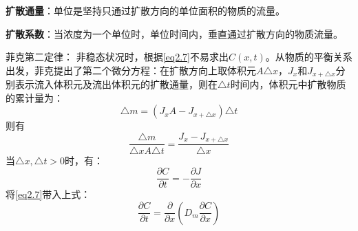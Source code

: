 \documentclass[UTF8]{ctexart}
\theoremstyle{plain}
\begin{document}
\textbf{\textcolor[rgb]{1,0,0}{扩散通量}}：单位是坚持只通过扩散方向的单位面积的物质的流量。

\textbf{\textcolor[rgb]{1,0,0}{扩散系数}}：当浓度为一个单位时，单位时间内，垂直通过扩散方向的物质流量。

\textcolor[rgb]{1,0,0}{菲克第二定律}：
非稳态状况时，根据\cref{eq2.7}不易求出$C(x,t)$。从物质的平衡关系出发，菲克提出了第二个微分方程：在扩散方向上取体积元$A\triangle x$，$J_x$和$J_{x+\triangle x}$分别表示流入体积元及流出体积元的扩散通量，则在$\triangle t$时间内，体积元中扩散物质的累计量为：
\begin{equation*}
    \triangle m = (J_xA - J_{x+\triangle x})\triangle t
\end{equation*}
则有
\begin{equation*}
    \dfrac{\triangle m}{\triangle x A \triangle t} = \dfrac{J_x-J_{x+\triangle x}}{\triangle x}
\end{equation*}
当$\triangle x, \triangle t>0$时，有：
\begin{equation*}
    \dfrac{\partial C}{\partial t} = -\dfrac{\partial J}{\partial x}
\end{equation*}
将\cref{eq2.7}带入上式：
\begin{equation*}
    \dfrac{\partial C}{\partial t} = \dfrac{\partial}{\partial x}\left(D_m \dfrac{\partial C}{\partial x}\right)
\end{equation*}



\end{document}
